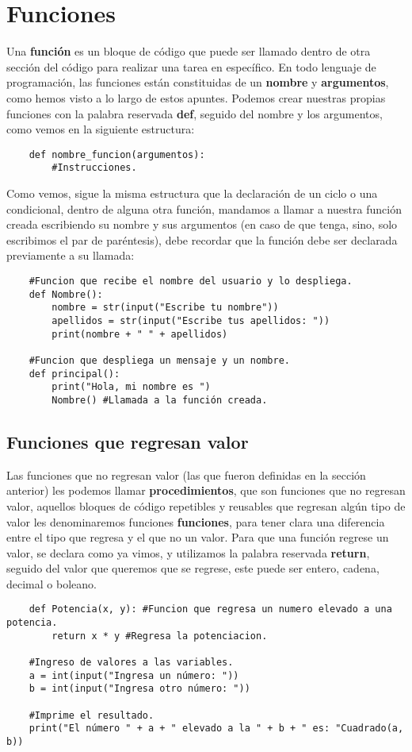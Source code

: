 \section{Funciones}
\hspace{0.55cm}Una \textbf{función} es un bloque de código que puede ser llamado dentro de otra sección del código para realizar una tarea en específico. En todo lenguaje de programación, las funciones están constituidas de un \textbf{nombre} y \textbf{argumentos}, como hemos visto a lo largo de estos apuntes. Podemos crear nuestras propias funciones con la palabra reservada \textbf{def}, seguido del nombre y los argumentos, como vemos en la siguiente estructura:
\begin{lstlisting}
	def nombre_funcion(argumentos):
		#Instrucciones.
\end{lstlisting}

Como vemos, sigue la misma estructura que la declaración de un ciclo o una condicional, dentro de alguna otra función, mandamos a llamar a nuestra función creada escribiendo su nombre y sus argumentos (en caso de que tenga, sino, solo escribimos el par de paréntesis), debe recordar que la función debe ser declarada previamente a su llamada:
\begin{lstlisting}
	#Funcion que recibe el nombre del usuario y lo despliega.
	def Nombre():
		nombre = str(input("Escribe tu nombre"))
		apellidos = str(input("Escribe tus apellidos: "))
		print(nombre + " " + apellidos)

	#Funcion que despliega un mensaje y un nombre.
	def principal():
		print("Hola, mi nombre es ")
		Nombre() #Llamada a la función creada.
\end{lstlisting}


\subsection{Funciones que regresan valor}
\hspace{0.55cm}Las funciones que no regresan valor (las que fueron definidas en la sección anterior) les podemos llamar \textbf{procedimientos}, que son funciones que no regresan valor, aquellos bloques de código repetibles y reusables que regresan algún tipo de valor les denominaremos funciones \textbf{funciones}, para tener clara una diferencia entre el tipo que regresa y el que no un valor. Para que una función regrese un valor, se declara como ya vimos, y utilizamos la palabra reservada \textbf{return}, seguido del valor que queremos que se regrese, este puede ser entero, cadena, decimal o boleano.
\begin{lstlisting}
	def Potencia(x, y): #Funcion que regresa un numero elevado a una potencia.
		return x * y #Regresa la potenciacion.

	#Ingreso de valores a las variables.
	a = int(input("Ingresa un número: "))
	b = int(input("Ingresa otro número: "))
	
	#Imprime el resultado.
	print("El número " + a + " elevado a la " + b + " es: "Cuadrado(a, b))
\end{lstlisting}

